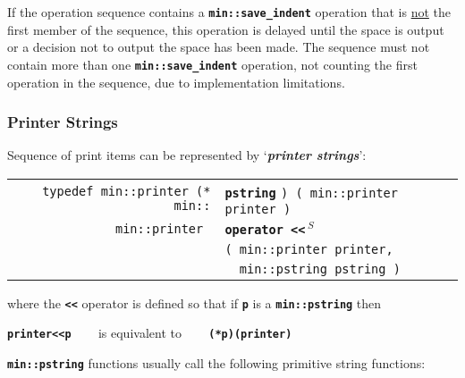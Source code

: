 \documentclass[12pt]{article}
\makeatletter
\newcommand{\TT}[1]{{\tt \bfseries #1}}
\newcommand{\skey}[2]{{\bf \em #1#2}\index{#1}}
\newcommand{\ttindex}[1]{\index{#1@{\tt #1}}}
\newcommand{\ttomkey}[3]{\TT{operator #2}\index{#1@{\tt operator #2}!{#3}}}
\newcommand{\EOL}{\penalty \exhyphenpenalty}
\newenvironment{indpar}[1][0.3in]%
	{\begin{list}{}%
		     {\setlength{\itemsep}{0in}%
		      \setlength{\topsep}{0in}%
		      \setlength{\parsep}{1ex}%
		      \setlength{\labelwidth}{#1}%
		      \setlength{\leftmargin}{#1}%
		      \addtolength{\leftmargin}{\labelsep}}%
	 \item}%
	{\end{list}}
\newcommand{\LABEL}[1]{\label{#1}}
\newlength{\ARGBREAKLENGTH}
\newcommand{\ARGBREAK}[1][\ARGBREAKLENGTH]{\\&\hspace*{#1}}
\newcommand{\TTOMKEY}[3]{\ttomkey{#1}{#2}{#3}}
\newcommand{\MINKEY}[1]%
	   {\TT{#1}\ttindex{min::#1}\ttindex{#1}}
\newcommand{\RESIZE}{$\,^S$}
\makeatother
\begin{document}
If the operation sequence contains a
\TT{min::save\_indent} operation\label{LEADING-TRAILING-SAVE-INDENT}
that is \underline{not} the first member of the sequence, this operation
is delayed until the space is output or a decision not to output
the space has been made.
The sequence must not contain more than one \TT{min::save\_indent}
operation, not counting the first operation in the sequence,
due to implementation limitations.


\subsubsection{Printer Strings}
\label{PRINTER-STRINGS}

Sequence of print items can be represented by `\skey{printer string}s':

\begin{indpar}\begin{tabular}{r@{}l}
\verb|typedef min::printer (* min::| & \MINKEY{pstring}
				       \verb|) ( min::printer printer )|
\LABEL{MIN::PSTRING} \\
\verb|min::printer |
    & \TTOMKEY{<<}{<{}<\RESIZE}%
              {of {\tt min::pstring}}\ARGBREAK
      \verb|( min::printer printer,|\ARGBREAK
      \verb|  min::pstring pstring )|
\LABEL{PRINTER_OPERATOR<<_OF_PSTRING} \\
\end{tabular}\end{indpar}

where the \TT{<{}<} operator is defined so that if \TT{p} is a
\TT{min::\EOL pstring} then
\begin{center}
\TT{printer<{}<p} ~~~ is equivalent to ~~~ \TT{(*p)(printer)}
\end{center}

\TT{min::pstring} functions usually call the following primitive
string functions:
\end{document}
